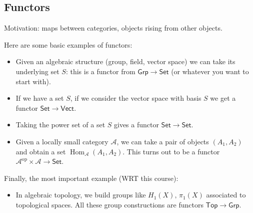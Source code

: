 \subsection{Functors}
Motivation: maps between categories, objects rising from other objects. 
\begin{example}
   Here are some basic examples of functors:
   \begin{itemize}
       \item Given an algebraic structure (group, field, vector space) we can take its underlying set $S$: this is a functor from $\mathsf{Grp}\to \mathsf{Set}$ (or whatever you want to start with).
       \item If we have a set $S$, if we consider the vector space with basis $S$ we get a functor $\mathsf{Set} \to \mathsf{Vect}$.
       \item Taking the power set of a set $S$ gives a functor $\mathsf{Set}\to \mathsf{Set}$.
       \item Given a locally small category $\mathcal{A}$, we can take a pair of objects $(A_1,A_2)$ and obtain a set $\operatorname{Hom}_{\mathcal{A}}(A_1,A_2)$. This turns out to be a functor $\mathcal{A}^{\text{op}}\times \mathcal{A}\to \mathsf{Set}$.
   \end{itemize}
   Finally, the most important example (WRT this course):
   \begin{itemize}
       \item In algebraic topology, we build groups like $H_1(X),\, \pi_1(X)$ associated to topological spaces. All these group constructions are functors $\mathsf{Top} \to \mathsf{Grp}$.
   \end{itemize}
\end{example}
